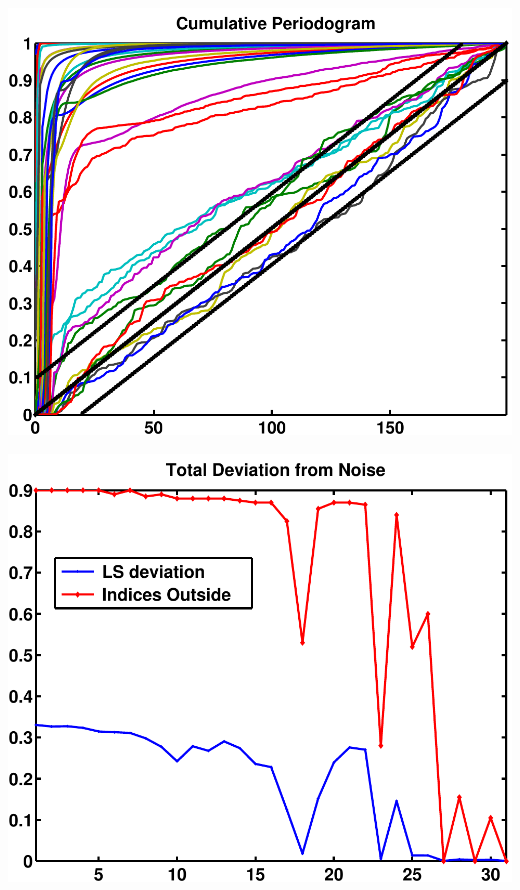 \documentclass[11pt]{amsart}
\begin{document}
	\vspace{5mm}
	\begin{minipage}[t]{0.5\textwidth}
	
		\includegraphics[width=.95\linewidth]{../presentation/figures/run1/cum_per} 
   
	\end{minipage}
	\begin{minipage}[t]{0.5\textwidth}
	
		\includegraphics[width=.95\linewidth]{../presentation/figures/run1/total_deviation} 
   
	\end{minipage}
    \vspace{5mm}
\end{document}
